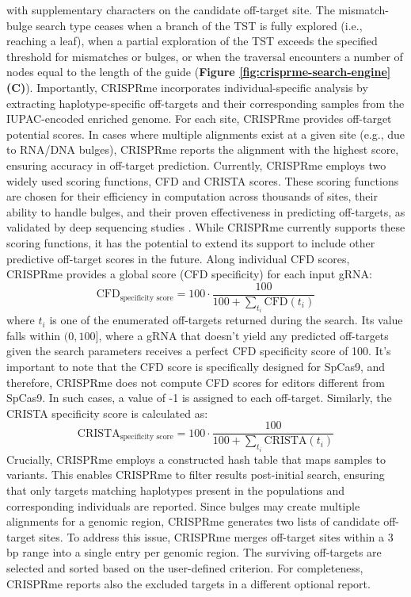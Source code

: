 \documentclass[a4paper, titlepage, openright]{book}
\newcommand{\crisprme}{CRISPRme\xspace}
\begin{document}
with supplementary characters on the candidate off-target site. The mismatch-bulge search type ceases when a branch of the TST is fully explored (i.e., reaching a leaf), when a partial exploration of the TST exceeds the specified threshold for mismatches or bulges, or when the traversal encounters a number of nodes equal to the length of the guide (\textbf{Figure \ref{fig:crisprme-search-engine} (C)}). Importantly, \crisprme incorporates individual-specific analysis by extracting haplotype-specific off-targets and their corresponding samples from the IUPAC-encoded enriched genome. For each site, \crisprme provides off-target potential scores. In cases where multiple alignments exist at a given site (e.g., due to RNA/DNA bulges), \crisprme reports the alignment with the highest score, ensuring accuracy in off-target prediction. Currently, \crisprme employs two widely used scoring functions, CFD \citep{doench2016optimized} and CRISTA \citep{abadi2017machine} scores. These scoring functions are chosen for their efficiency in computation across thousands of sites, their ability to handle bulges, and their proven effectiveness in predicting off-targets, as validated by deep sequencing studies \citep{bao2021tools}. While \crisprme currently supports these scoring functions, it has the potential to extend its support to include other predictive off-target scores in the future. Along individual CFD scores, \crisprme provides a global score (CFD specificity) for each input gRNA:
\[
    \text{CFD}_{\text{specificity score}}=100 \cdot \frac{100}{100 + \sum_{t_{i}}{\text{CFD}(t_{i})}}
\]
where $t_{i}$ is one of the enumerated off-targets returned during the search. Its value falls within $(0, 100]$, where a gRNA that doesn't yield any predicted off-targets given the search parameters receives a perfect CFD specificity score of 100. It's important to note that the CFD score is specifically designed for SpCas9, and therefore, \crisprme does not compute CFD scores for editors different from SpCas9. In such cases, a value of -1 is assigned to each off-target. Similarly, the CRISTA specificity score is calculated as:
\[
    \text{CRISTA}_{\text{specificity score}} = 100 \cdot \frac{100}{100 + \sum_{t_{i}}{\text{CRISTA}(t_{i})}}
\]
Crucially, \crisprme employs a constructed hash table that maps samples to variants. This enables \crisprme to filter results post-initial search, ensuring that only targets matching haplotypes present in the populations and corresponding individuals are reported. Since bulges may create multiple alignments for a genomic region, \crisprme generates two lists of candidate off-target sites. To address this issue, \crisprme merges off-target sites within a 3 bp range into a single entry per genomic region. The surviving off-targets are selected and sorted based on the user-defined criterion. For completeness, \crisprme reports also the excluded targets in a different optional report.
\end{document}
